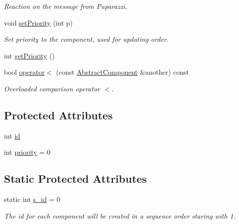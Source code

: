 \begin{DoxyCompactItemize}
\begin{DoxyCompactList}\small\item\em Reaction on the message from Paparazzi. \end{DoxyCompactList}\item 
void \hyperlink{class_abstract_component_a58a59a9ea6c3b4c86fb3bf98ff1eaaef}{set\+Priority} (int p)
\begin{DoxyCompactList}\small\item\em Set priority to the component, used for updating order. \end{DoxyCompactList}\item 
int \hyperlink{class_abstract_component_ac0b440d1d642ff1292ec3c544d75a8f1}{get\+Priority} ()
\item 
bool \hyperlink{class_abstract_component_a0c2e458144111c5f599c66f168516abc}{operator$<$} (const \hyperlink{class_abstract_component}{Abstract\+Component} \&another) const
\begin{DoxyCompactList}\small\item\em Overloaded comparison operator \textquotesingle{}$<$\textquotesingle{}. \end{DoxyCompactList}\end{DoxyCompactItemize}
\subsection*{Protected Attributes}
\begin{DoxyCompactItemize}
\item 
int \hyperlink{class_abstract_component_a9c9c548149681b1a1dd935e66ed5dd11}{id}
\item 
int \hyperlink{class_abstract_component_aff57dfa5f31be093a06b55560e33fb95}{priority} = 0
\end{DoxyCompactItemize}
\subsection*{Static Protected Attributes}
\begin{DoxyCompactItemize}
\item 
static int \hyperlink{class_abstract_component_a99ce3e5fe7d73dac569b874c15fcaf0d}{s\+\_\+id} = 0
\begin{DoxyCompactList}\small\item\em The id for each component will be created in a sequence order staring with 1. \end{DoxyCompactList}\end{DoxyCompactItemize}
